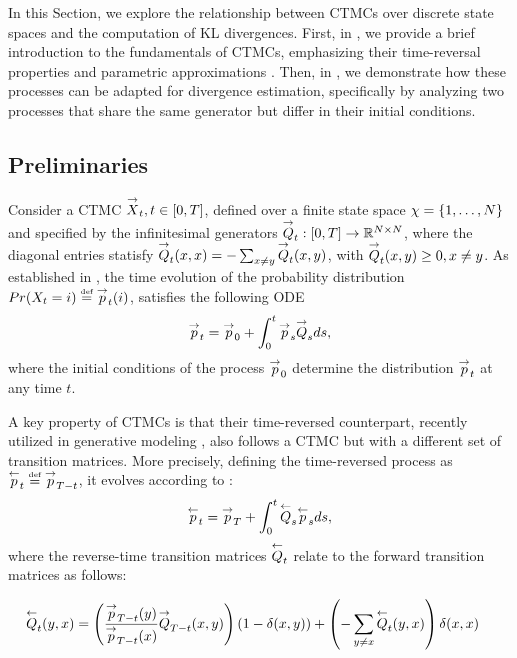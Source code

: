 In this Section, we explore the relationship between \glspl{CTMC} over discrete state spaces \citep{anderson2012continuous} and the computation of \gls{KL} divergences. First, in , we provide a brief introduction to the fundamentals of \glspl{CTMC}, emphasizing their time-reversal properties and parametric approximations \citep{lou2024discrete}. Then, in , we demonstrate how these processes can be adapted for divergence estimation, specifically by analyzing two processes that share the same generator but differ in their initial conditions.

\subsection{Preliminaries}\label{subsec:ctmc}
Consider a \gls{CTMC} $\overset{\rightarrow}{X}_t, t \in[0,T]$, defined over a finite state space $\chi = \left\{1,\hdots,N\right\}$ and  specified by the infinitesimal generators $\overset{\rightarrow}{Q}_t: [0,T]\rightarrow \mathbb{R}^{N\times N}$, where the diagonal entries statisfy $\overset{\rightarrow}{Q}_t(x,x)=-\sum_{x\neq y}\overset{\rightarrow}{Q}_t(x,y)$, with $\overset{\rightarrow}{Q}_t(x,y)\geq 0, x\neq y$. As established in \citep{anderson2012continuous}, the time evolution of the probability distribution $Pr(X_t=i)\stackrel{\text{\tiny def}}{=} \overset{\rightarrow}{p}_t(i)$, satisfies the following \gls{ODE} 
\begin{equation}\label{for_ode}
\overset{\rightarrow}{p}_t =\overset{\rightarrow}{p}_0+\int_0^t \overset{\rightarrow}{p}_s\overset{\rightarrow}{Q}_s ds,
\end{equation}
where the initial conditions of the process $\overset{\rightarrow}{p}_0$ determine the distribution $\overset{\rightarrow}{p}_t$ at any time $t$. 

A key property of \glspl{CTMC} is that their time-reversed counterpart, recently utilized in generative modeling \citep{lou2024discrete}, also follows a \gls{CTMC} but with a different set of transition matrices. More precisely, defining the time-reversed process as $\overset{\leftarrow}{p}_t\stackrel{\text{\tiny def}}{=}\overset{\rightarrow}{p}_{T-t}$, it evolves according to \citep{lou2024discrete,sun2023scorebasedcontinuoustimediscretediffusion}:
\begin{align}\label{eq:bctmc}
    \overset{\leftarrow}{p}_t =\overset{\rightarrow}{p}_T+\int_0^t \overset{\leftarrow}{Q}_s\overset{\leftarrow}{p}_s ds,
\end{align}
where the reverse-time transition matrices $\overset{\leftarrow}{Q}_t$ relate to the forward transition matrices as follows:

\begin{align}\label{eq:ratesdef}
    \overset{\leftarrow}{Q}_t(y,x) &= \left(\frac{\overset{\rightarrow}{p}_{T-t}(y)}{\overset{\rightarrow}{p}_{T-t}(x)} \overset{\rightarrow}{Q}_{T-t}(x,y)\right) (1-\delta(x,y))+\left(-\sum_{y\neq x}\overset{\leftarrow}{Q}_t(y,x)\right)\delta(x,x)
\end{align}

